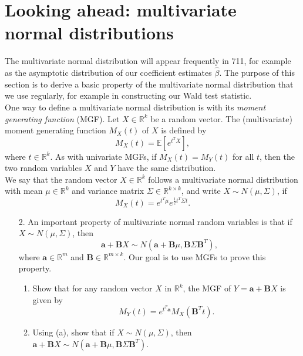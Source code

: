 \documentclass[11pt]{article}
\begin{document}
\section*{Looking ahead: multivariate normal distributions}

\noindent The multivariate normal distribution will appear frequently in 711, for example as the asymptotic distribution of our coefficient estimates $\widehat{\beta}$. The purpose of this section is to derive a basic property of the multivariate normal distribution that we use regularly, for example in constructing our Wald test statistic.\\


\noindent One way to define a multivariate normal distribution is with its \textit{moment generating function} (MGF).  Let $X \in \mathbb{R}^k$ be a random vector. The (multivariate) moment generating function $M_X(t)$ of $X$ is defined by
$$M_X(t) = \mathbb{E}[e^{t^T X}],$$
where $t \in \mathbb{R}^k$. As with univariate MGFs, if $M_X(t) = M_Y(t)$ for all $t$, then the two random variables $X$ and $Y$ have the same distribution.\\

\noindent We say that the random vector $X \in \mathbb{R}^k$ follows a multivariate normal distribution with mean $\mu \in \mathbb{R}^k$ and variance matrix $\Sigma \in \mathbb{R}^{k \times k}$, and write $X \sim N(\mu, \Sigma)$, if 
$$M_X(t) = e^{t^T \mu} e^{\frac{1}{2} t^T \Sigma t}.$$

\begin{enumerate}
\item[2.] An important property of multivariate normal random variables is that if $X \sim N(\mu, \Sigma)$, then
$$\bm{a} + \bm{B} X \sim N(\bm{a} + \bm{B} \mu, \bm{B} \Sigma \bm{B}^T),$$
where $\bm{a} \in \mathbb{R}^m$ and $\bm{B} \in \mathbb{R}^{m \times k}$. Our goal is to use MGFs to prove this property.

\begin{enumerate}
\item Show that for any random vector $X$ in $\mathbb{R}^k$, the MGF of $Y = \bm{a} + \bm{B} X$ is given by
$$M_Y(t) = e^{t^T \bm{a}} M_X(\bm{B}^T t).$$

\item Using (a), show that if $X \sim N(\mu, \Sigma)$, then $\bm{a} + \bm{B} X \sim N(\bm{a} + \bm{B} \mu, \bm{B} \Sigma \bm{B}^T)$.
\end{enumerate}
\end{enumerate}
\end{document}

